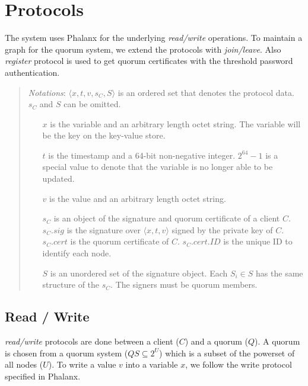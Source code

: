 \section{Protocols}
The system uses Phalanx \cite{Delhi:2} for the underlying {\em
read/write} operations. To maintain a graph for the quorum system, we
extend the protocols with {\em join/leave}. Also {\em register}
protocol is used to get quorum certificates with the threshold
password authentication.

\begin{quote}
  {\em Notations}:
  $\langle x, t, v, s_C, S \rangle$ is an ordered set that denotes the protocol
  data. $s_C$ and $S$ can be omitted.
  \begin{itemize}
  \item[$x$] is the variable and an arbitrary length octet string. The variable will
    be the key on the key-value store.
  \item[$t$] is the timestamp and a 64-bit non-negative integer. $2^{64}-1$ is
    a special value to denote that the variable is no longer able to be
    updated.
  \item[$v$] is the value and an arbitrary length octet string.
  \item[$s_C$] is an object of the signature and quorum certificate of a
    client $C$. $s_C.sig$ is the signature over $\langle x, t, v \rangle$ signed by the
    private key of $C$. $s_C.cert$ is the quorum certificate of
    $C$. $s_C.cert.ID$ is the unique ID to identify each node.
  \item[$S$] is an unordered set of the signature object. Each $S_i
    \in S$ has the
    same structure of the $s_C$. The signers must be quorum members.
  \end{itemize}
\end{quote}

\subsection{Read / Write}
\label{rw}
{\em read/write} protocols are done between a client ($C$) and a
quorum ($Q$). A quorum is chosen from a quorum system ($QS \subseteq
2^U$) which is a subset of the powerset of all nodes ($U$).  To write
a value $v$ into a variable $x$, we follow the write protocol
specified in Phalanx.\\

